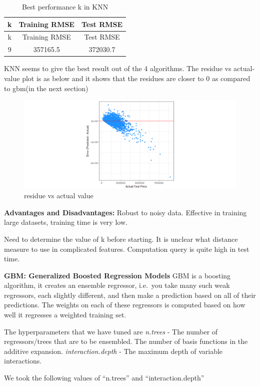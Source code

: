 \documentclass[]{article}
\begin{document}
\begin{longtable}[]{@{}ccc@{}}
\caption{Best performance k in KNN}\tabularnewline
\toprule
k & Training RMSE & Test RMSE\tabularnewline
\midrule
\endfirsthead
\toprule
k & Training RMSE & Test RMSE\tabularnewline
\midrule
\endhead
9 & 357165.5 & 372030.7\tabularnewline
\bottomrule
\end{longtable}

KNN seems to give the best result out of the 4 algorithms. The residue
vs actual-value plot is as below and it shows that the residues are
closer to 0 as compared to gbm(in the next section)

\begin{figure}
\centering
\includegraphics{Report_files/figure-latex/unnamed-chunk-22-1.pdf}
\caption{residue vs actual value}
\end{figure}

\textbf{Advantages and Disadvantages:} Robust to noisy data. Effective
in training large datasets, training time is very low.

Need to determine the value of k before starting. It is unclear what
distance measure to use in complicated features. Computation query is
quite high in test time.

\textbf{GBM: Generalized Boosted Regression Models} GBM is a boosting
algorithm, it creates an ensemble regressor, i.e.~you take many such
weak regressors, each slightly different, and then make a prediction
based on all of their predictions. The weights on each of these
regressors is computed based on how well it regresses a weighted
training set.

The hyperparameters that we have tuned are \emph{n.trees} - The number
of regressors/trees that are to be ensembled. The number of basis
functions in the additive expansion. \emph{interaction.depth} - The
maximum depth of variable interactions.

We took the following values of ``n.trees'' and ``interaction.depth''
\end{document}

